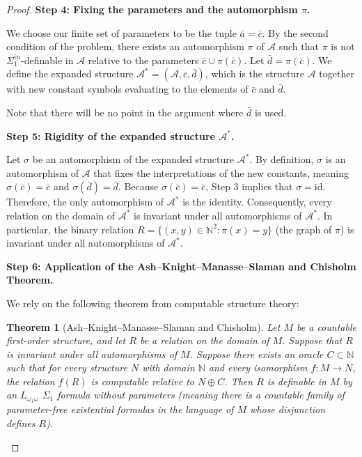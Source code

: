 \documentclass[12pt]{article}
\newtheorem*{theorem*}{Theorem}
\newcommand{\review}[1]{\begin{reviewbox}#1\end{reviewbox}}
\begin{document}
\begin{proof}
\textbf{Step 4: Fixing the parameters and the automorphism $\pi$.}

We choose our finite set of parameters to be the tuple $\bar{a} = \bar{c}$. By the second condition of the problem, there exists an automorphism $\pi$ of $\mathcal{A}$ such that $\pi$ is not $\Sigma^{in}_1$-definable in $\mathcal{A}$ relative to the parameters $\bar{c} \cup \pi(\bar{c})$. 
Let $\bar{d} = \pi(\bar{c})$. 
We define the expanded structure $\mathcal{A}^* = (\mathcal{A}, \bar{c}, \bar{d})$, which is the structure $\mathcal{A}$ together with new constant symbols evaluating to the elements of $\bar{c}$ and $\bar{d}$. 

\review{Note that there will be no point in the argument where $\bar{d}$ is used.}

\textbf{Step 5: Rigidity of the expanded structure $\mathcal{A}^*$.}

Let $\sigma$ be an automorphism of the expanded structure $\mathcal{A}^*$. By definition, $\sigma$ is an automorphism of $\mathcal{A}$ that fixes the interpretations of the new constants, meaning $\sigma(\bar{c}) = \bar{c}$ and $\sigma(\bar{d}) = \bar{d}$. 
Because $\sigma(\bar{c}) = \bar{c}$, Step 3 implies that $\sigma = \mathrm{id}$. 
Therefore, the only automorphism of $\mathcal{A}^*$ is the identity. Consequently, every relation on the domain of $\mathcal{A}^*$ is invariant under all automorphisms of $\mathcal{A}^*$. 
In particular, the binary relation $R = \{(x, y) \in \mathbb{N}^2 : \pi(x) = y\}$ (the graph of $\pi$) is invariant under all automorphisms of $\mathcal{A}^*$.

\textbf{Step 6: Application of the Ash--Knight--Manasse--Slaman and Chisholm Theorem.}

We rely on the following theorem from computable structure theory:
\begin{theorem*}[Ash--Knight--Manasse--Slaman and Chisholm]
Let $M$ be a countable first-order structure, and let $R$ be a relation on the domain of $M$. Suppose that $R$ is invariant under all automorphisms of $M$. Suppose there exists an oracle $C \subset \mathbb{N}$ such that for every structure $N$ with domain $\mathbb{N}$ and every isomorphism $f: M \to N$, the relation $f(R)$ is computable relative to $N \oplus C$. Then $R$ is definable in $M$ by an $L_{\omega_1\omega}$ $\Sigma_1$ formula without parameters (meaning there is a countable family of parameter-free existential formulas in the language of $M$ whose disjunction defines $R$).
\end{theorem*}


\end{proof}
\end{document}
